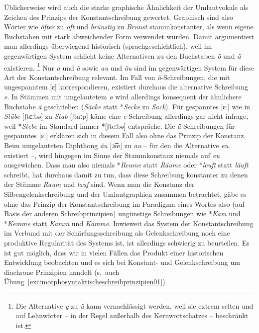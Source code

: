 Üblicherweise wird auch die starke graphische Ähnlichkeit der Umlautvokale als Zeichen des Prinzips der Konstantschreibung gewertet.
Graphisch sind also Wörter wie \textit{öfter} zu \textit{oft} und \textit{brünstig} zu \textit{Brunst} stammkonstanter, als wenn eigene Buchstaben mit stark abweichender Form verwendet würden.
Damit argumentiert man allerdings überwiegend historisch (sprachgeschichtlich), weil im gegenwärtigen System schlicht keine Alternativen zu den Buchstaben \textit{ö} und \textit{ü} existieren.%
\footnote{Die Alternative \textit{y} zu \textit{ü} kann vernachlässigt werden, weil sie extrem selten und auf Lehnwörter -- in der Regel außerhalb des Kernwortschatzes -- beschränkt ist.}
Nur \textit{a} und \textit{ä} sowie \textit{au} und \textit{äu} sind im gegenwärtigen System für diese Art der Konstantschreibung relevant.
Im Fall von \textit{ä}-Schreibungen, die mit ungespanntem [ɛ] korrespondieren, existiert durchaus die alternative Schreibung \textit{e}.
In Stämmen mit umgelautetem \textit{a} wird allerdings konsequent der ähnlichere Buchstabe \textit{ä} geschrieben (\textit{Säcke} statt *\textit{Secke} zu \textit{Sack}).
Für gespanntes [ɛː] wie in \textit{Stäbe} [ʃtɛːbə] zu \textit{Stab} [ʃtaːp] käme eine \textit{e}-Schreibung allerdings gar nicht infrage, weil *\textit{Stebe} im Standard immer *[ʃteːbə] entspräche.
Die \textit{ä}-Schreibungen für gespanntes [ɛː] erklären sich in diesem Fall also ohne das Prinzip der Konstanz.
Beim umgelauteten Diphthong \textit{äu} [ɔ͡œ] zu \textit{au} -- für den die Alternative \textit{eu} existiert --, wird hingegen im Sinne der Stammkonstanz niemals auf \textit{eu} ausgewichen.
Dass man also niemals *\textit{Reume} statt \textit{Räume} oder *\textit{leuft} statt \textit{läuft} schreibt, hat durchaus damit zu tun, dass diese Schreibung konstanter zu denen der Stämme \textit{Raum} und \textit{lauf} sind.
Wenn man die Konstanz der Silbengelenkschreibung und der Umlautgraphien zusammen betrachtet, gäbe es ohne das Prinzip der Konstantschreibung im Paradigma eines Wortes also (auf Basis der anderen Schreibprinzipien) ungünstige Schreibungen wie *\textit{Kam} und *\textit{Kemme} statt \textit{Kamm} und \textit{Kämme}.
Inwieweit das System der Konstantschreibung im Verbund mit der Schärfungsschreibung als Gelenkschreibung noch eine produktive Regularität des Systems ist, ist allerdings schwierig zu beurteilen.
Es ist gut möglich, dass wir in vielen Fällen das Produkt einer historischen Entwicklung beobachten und es sich bei Konstant- und Gelenkschreibung um diachrone Prinzipien handelt (s.\ auch Übung~\ref{exc:morphosyntaktischeschreibprinzipien01}).

